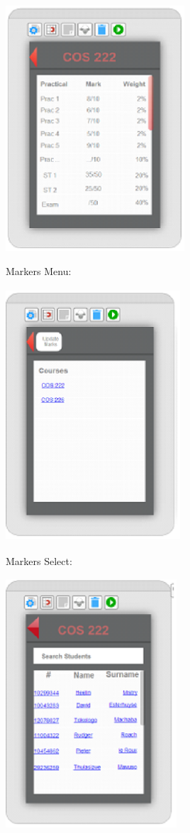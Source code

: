 \documentclass{article}
\begin{document}
\includegraphics*[width=2.63in, height=3.61in, keepaspectratio=false]{image25}







Markers Menu:

 \includegraphics*[width=2.56in, height=3.70in, keepaspectratio=false]{image26}



Markers Select: 

\includegraphics*[width=2.51in, height=3.67in, keepaspectratio=false]{image27}
\end{document}
